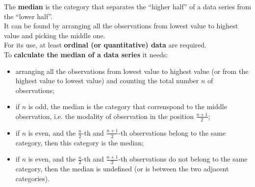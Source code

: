 \begin{frame}
  \vspace{.75cm}
  The \textbf{median} is the category that separates the ``higher half'' of a data series from the ``lower half''. \\
  \vspace{1cm}
  It can be found by arranging all the observations from lowest value to highest value and picking the middle one.\\
  \vspace{1cm}
  For its use, at least \textbf{ordinal (or quantitative) data} are required.\\
  \vspace{1cm}
  To \textbf{calculate the median of a data series} it needs:\\
\end{frame}

\begin{frame}
  \begin{itemize}
    \item arranging all the observations from lowest value to highest value (or from the highest value to lowest value) and counting the total number $n$ of observations;
    \vspace{.15cm}
    \item if $n$ is odd, the median is the category that correnspond to the middle observation, i.e. the modality of observation in the position {\boldmath $\frac{n+1}{2}$};
    \vspace{.15cm}
    \item if $n$ is even, and the $\frac{n}{2}$-th and $\frac{n+1}{2}$-th observations belong to the same category, then this category is the median;
    \vspace{.15cm}
    \item if $n$ is even, and the $\frac{n}{2}$-th and $\frac{n+1}{2}$-th observations do not belong to the same category, then the median is undefined (or is between the two adjacent categories).
   \end{itemize}
\end{frame}


